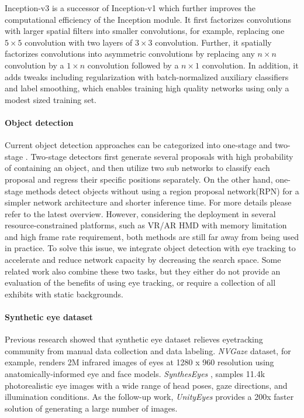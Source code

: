 Inception-v3 is a successor of Inception-v1 \cite{szegedy2015going} which further improves the computational efficiency of the Inception module. It first factorizes convolutions with larger spatial filters into smaller convolutions, for example, replacing one $5 \times 5$ convolution with two layers of $3 \times 3$ convolution. Further, it spatially factorizes convolutions into asymmetric convolutions by replacing any $n \times n$ convolution by a $1 \times n$ convolution followed by a $n \times 1$ convolution. In addition, it adds tweaks including regularization with batch-normalized auxiliary classifiers and label smoothing, which enables training high quality networks using only a modest sized training set.

\paragraph{Object detection} Current object detection approaches can be categorized into one-stage \cite{redmon2016you, liu2016ssd, lin2017focal} and two-stage \cite{girshick2014rich, girshick2015fast, ren2015faster, he2017mask}. Two-stage detectors first generate several proposals with high probability of containing an object, and then utilize two sub networks to classify each proposal and regress their specific positions separately. On the other hand, one-stage methods detect objects without using a region proposal network(RPN) for a simpler network architecture and shorter inference time. For more details please refer to the latest overview\cite{liu2020deep}. However, considering the deployment in several resource-constrained platforms, such as VR/AR HMD with memory limitation and high frame rate requirement, both methods are still far away from being used in practice. To solve this issue, we integrate object detection with eye tracking to accelerate and reduce network capacity by decreasing the search space. Some related work \cite{toyama2012gaze, ishiguro2010aided, bonino2009blueprint} also combine these two tasks, but they either do not provide an evaluation of the benefits of using eye tracking, or require a collection of all exhibits with static backgrounds. 

\paragraph{Synthetic eye dataset} Previous research showed that synthetic eye dataset relieves eyetracking community from manual data collection and data labeling. \emph{NVGaze} \cite{kim2019nvgaze} dataset, for example, renders 2M infrared images of eyes at 1280 x 960 resolution using anatomically-informed eye and face models. \emph{SynthesEyes} \cite{wood2015rendering}, samples 11.4k photorealistic eye images with a wide range of head
poses, gaze directions, and illumination conditions. As the follow-up work, \emph{UnityEyes} \cite{wood2016learning} provides a 200x faster solution of generating a large number of images.

